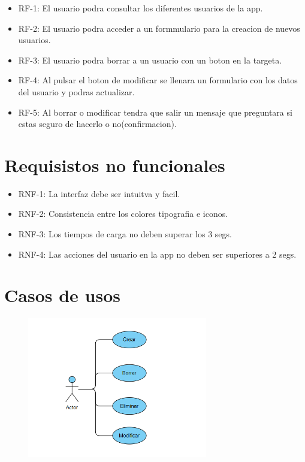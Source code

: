 \documentclass{article}
\begin{document}
\begin{itemize}
    \item RF-1: El usuario podra consultar los diferentes usuarios de la app.
    \item RF-2: El usuario podra acceder a un formmulario para la creacion de nuevos usuarios.
    \item RF-3: El usuario podra borrar a un usuario con un boton en la targeta.
    \item RF-4: Al pulsar el boton de modificar se llenara un formulario con los datos del usuario y podras actualizar.
    \item RF-5: Al borrar o modificar tendra que salir un mensaje que preguntara si estas seguro de hacerlo o no(confirmacion).
\end{itemize}

\section{Requisistos no funcionales}

\begin{itemize}

    \item RNF-1: La interfaz debe ser intuitva y facil.
    \item RNF-2: Consistencia entre los colores tipografia e iconos.
    \item RNF-3: Los tiempos de carga no deben superar los 3 segs.
    \item RNF-4: Las acciones del usuario en la app no deben ser superiores a 2 segs.
    
\end{itemize}
\newpage
\section{Casos de usos}
\begin{figure}[h!]
    \centering
    \includegraphics[width=0.7\textwidth]{diagramaUso.png}
\end{figure}
\end{document}
